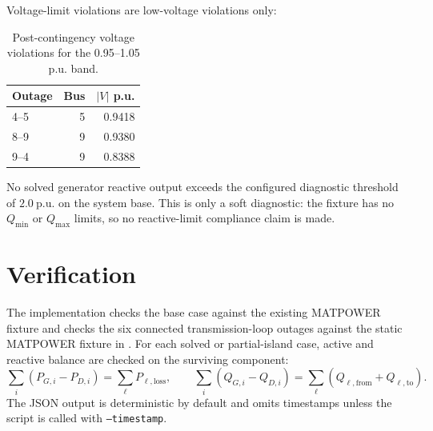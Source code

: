 \documentclass[11pt]{article}
\newcommand{\pu}{\mathrm{p.u.}}
\begin{document}
Voltage-limit violations are low-voltage violations only:

\begin{table}[htbp]
\centering
\caption{Post-contingency voltage violations for the 0.95--1.05 p.u. band.}
\label{tab:violations}
\begin{tabular}{@{}lrr@{}}
\toprule
Outage & Bus & $|V|$ p.u. \\
\midrule
4--5 & 5 & 0.9418 \\
8--9 & 9 & 0.9380 \\
9--4 & 9 & 0.8388 \\
\bottomrule
\end{tabular}
\end{table}

No solved generator reactive output exceeds the configured diagnostic
threshold of $2.0~\pu$ on the system base. This is only a soft diagnostic:
the fixture has no $Q_{\min}$ or $Q_{\max}$ limits, so no reactive-limit
compliance claim is made.

\section{Verification}

The implementation checks the base case against the existing MATPOWER
fixture and checks the six connected transmission-loop outages against the
static MATPOWER fixture in . For each
solved or partial-island case, active and reactive balance are checked on
the surviving component:
\[
  \sum_i (P_{G,i} - P_{D,i}) = \sum_{\ell} P_{\ell,\mathrm{loss}},
  \qquad
  \sum_i (Q_{G,i} - Q_{D,i}) =
  \sum_{\ell} (Q_{\ell,\mathrm{from}} + Q_{\ell,\mathrm{to}}).
\]
The JSON output is deterministic by default and omits timestamps unless the
script is called with \texttt{--timestamp}.
\end{document}
